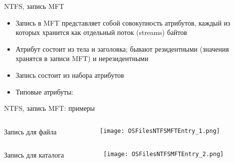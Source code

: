\documentclass[aspectratio=169,14pt]{beamer}
\begin{document}
\begin{frame}{NTFS, запись MFT}
    \begin{footnotesize}
        \begin{itemize}
            \item Запись в MFT представляет собой совокупность атрибутов,
            каждый из которых хранится как отдельный поток (streams) байтов
            \item Атрибут состоит из тела и заголовка; бывают резидентными
            (значения хранятся в записи MFT) и нерезидентными
            \item Запись состоит из набора атрибутов
            \item Типовые атрибуты:
            \begin{itemize}
        \end{itemize}
        \end{itemize}
    \end{footnotesize}
\end{frame}

\begin{frame}{NTFS, запись MFT: примеры}
    \begin{columns}
        \begin{column}{0.2\textwidth}
            Запись для файла
        \end{column}
        \begin{column}{0.8\textwidth}
            \texttt{[image: OSFilesNTFSMFTEntry\_1.png]}
        \end{column}
    \end{columns}
    \begin{columns}
        \begin{column}{0.2\textwidth}
            Запись для каталога
        \end{column}
        \begin{column}{0.8\textwidth}
            \texttt{[image: OSFilesNTFSMFTEntry\_2.png]}
        \end{column}
    \end{columns}
\end{frame}
\end{document}

